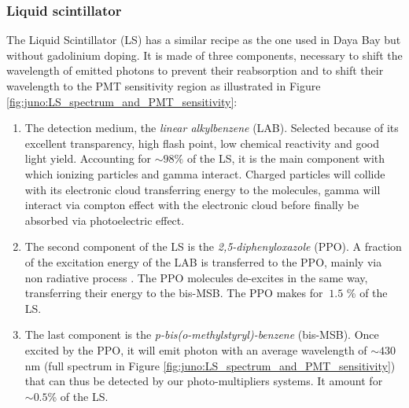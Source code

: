 \documentclass[../main.tex]{subfiles}
\begin{document}
\subsubsection{Liquid scintillator}
\label{sec:juno:LS}

The Liquid Scintillator (LS) has a similar recipe as the one used in Daya Bay \cite{bay_optimization_2020} but without gadolinium doping. It is made of three components, necessary to shift the wavelength of emitted photons to prevent their reabsorption and to shift their wavelength to the PMT sensitivity region as illustrated in Figure \ref{fig:juno:LS_spectrum_and_PMT_sensitivity}:
\begin{enumerate}
  \item The detection medium, the \textit{linear alkylbenzene} (LAB). Selected because of its excellent transparency, high flash point, low chemical reactivity and good light yield. Accounting for $\sim 98\%$ of the LS, it is the main component with which ionizing particles and gamma interact. Charged particles will collide with its electronic cloud transferring energy to the molecules, gamma will interact via compton effect with the electronic cloud before finally be absorbed via photoelectric effect.
  \item The second component of the LS is the \textit{2,5-diphenyloxazole} (PPO). A fraction of the excitation energy of the LAB is transferred to the PPO, mainly via non radiative process \cite{birks_chapter_1964}. The PPO molecules de-excites in the same way, transferring their energy to the bis-MSB. The PPO makes for $~1.5$ \% of the LS.
  \item The last component is the \textit{p-bis(o-methylstyryl)-benzene} (bis-MSB). Once excited by the PPO, it will emit photon with an average wavelength of $\sim430$ nm (full spectrum in Figure \ref{fig:juno:LS_spectrum_and_PMT_sensitivity}) that can thus be detected by our photo-multipliers systems. It amount for $\sim 0.5$\% of the LS.
\end{enumerate}
\end{document}
